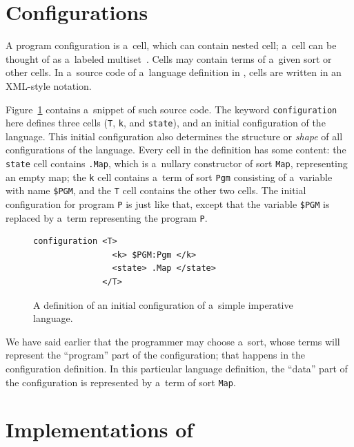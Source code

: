 \documentclass[nolot,nolof,nocover,printed]{fithesis3}
\begin{document}
\section{Configurations}

A program configuration is a~cell, which can contain nested cell; a~cell 
can be thought of as a~labeled multiset~\cite{hathhorn-ellison-rosu-2015-pldi}. Cells may contain terms of a~given sort or other cells. In a~source code of a~language definition in \K, cells are written in an XML-style notation.

Figure~\ref{impConfiguration} contains a~snippet of such source code. The keyword \lstinline|configuration| here defines three cells (\lstinline|T|, \lstinline|k|, and \lstinline|state|), and an initial configuration of the language. This initial configuration also determines the structure or \textit{shape} of all configurations of the language. Every cell in the definition has some content: the \lstinline|state| cell contains \lstinline|.Map|, which is a~nullary constructor of sort \lstinline|Map|, representing an empty map; the \lstinline|k| cell contains a~term of sort \lstinline|Pgm| consisting of a~variable with name \lstinline|$PGM|, and the \lstinline|T| cell contains the other two cells. The initial configuration for program \lstinline|P| is just like that, except that the variable \lstinline|$PGM| is replaced by a~term representing the program \lstinline|P|.

\begin{figure}
\begin{lstlisting}
configuration <T>
                <k> $PGM:Pgm </k>
                <state> .Map </state>
              </T>
\end{lstlisting}
\caption{A definition of an initial configuration of a~simple imperative language.}
\label{impConfiguration}
\end{figure}

We have said earlier that the programmer may choose a~sort, whose terms will represent the \enquote{program} part of the configuration; that happens in the configuration definition. In this particular language definition, the \enquote{data} part of the configuration is represented by a~term of sort \lstinline|Map|. %



\section{Implementations of \K}
\end{document}

